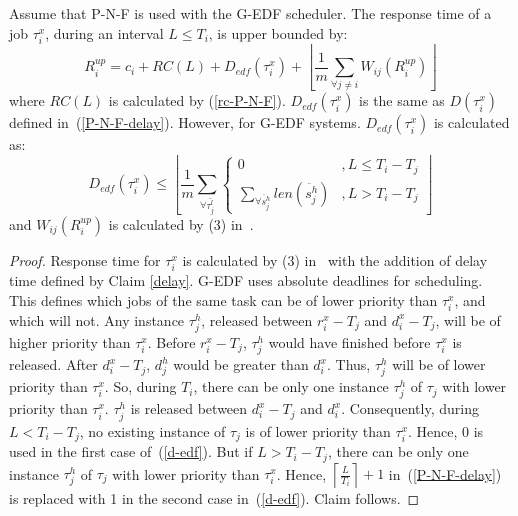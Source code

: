 \begin{clm}\label{response time ecm P-N-F}
Assume that P-N-F is used with the G-EDF scheduler. The response
time of a job $\tau_{i}^{x}$, during an interval $L\le T_{i}$, is
upper bounded by:
\begin{equation}
R_{i}^{up}=c_{i}+RC(L)+D_{edf}(\tau_{i}^{x})+\left\lfloor \frac{1}{m}\sum_{\forall j\ne i}W_{ij}(R_{i}^{up})\right\rfloor 
\end{equation}
where $RC(L)$ is calculated by (\ref{rc-P-N-F}). $D_{edf}(\tau_{i}^{x})$
is the same as $D(\tau_{i}^{x})$ defined in~(\ref{P-N-F-delay}). However, for G-EDF systems. $D_{edf}(\tau_i^x)$ is calculated as:
\begin{equation}
D_{edf}(\tau_{i}^{x})\le\left\lfloor \frac{1}{m}\sum_{\forall\bar{\tau_{j}^{l}}}\begin{cases}
0 & ,L\le T_{i}-T_{j}\\
\sum_{\forall\ddot{s_{j}^{h}}}len\left(\ddot{s_{j}^{h}}\right) & ,L>T_{i}-T_{j}
\end{cases}\right\rfloor \label{d-edf}
\end{equation}
and $W_{ij}(R_{i}^{up})$ is calculated by (3) in~\cite{stmconcurrencycontrol:emsoft11}.
\end{clm}
\begin{proof}
Response time for $\tau_{i}^{x}$ is calculated by (3) in~\cite{stmconcurrencycontrol:emsoft11} with the addition of delay time 
defined by Claim \ref{delay}. G-EDF uses absolute deadlines for scheduling. This defines which jobs of the same task can be of lower priority than $\tau_{i}^{x}$, and which will not. Any instance $\tau_j^h$, released between $r_i^x - T_j$ and $d_i^x - T_j$, will be of higher priority than $\tau_i^x$. Before $r_i^x-T_j$, $\tau_j^h$ would have finished before $\tau_i^x$ is released. After $d_i^x-T_j$, $d_j^h$ would be greater than $d_i^x$. Thus, $\tau_j^h$ will be of lower priority than $\tau_i^x$. So, during $T_i$, there can be only one instance $\tau_j^h$ of $\tau_j$ with lower priority than $\tau_i^x$. $\tau_j^h$ is released between $d_i^x-T_j$ and $d_i^x$. Consequently, during $L<T_i-T_j$, no existing instance of $\tau_j$ is of lower  priority than $\tau_i^x$. Hence, 0 is used in the first case of~(\ref{d-edf}). But if $L>T_i-T_j$, there can be only one instance $\tau_j^h$ of $\tau_j$ with lower priority than $\tau_i^x$. Hence, $\left\lceil\frac{L}{T_i}\right\rceil+1$ in~(\ref{P-N-F-delay}) is replaced with 1 in the second case in~(\ref{d-edf}). Claim follows.
\end{proof}


